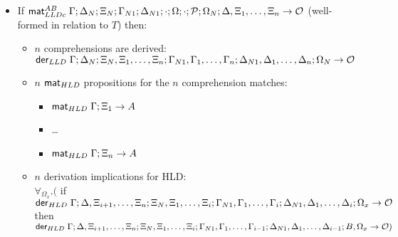 \begin{theorem}
\begin{itemize}[leftmargin=*]
   \item If $\mathsf{mat}_{LLDc}^{AB} \; \Gamma; \Delta_N; \Xi_N; \Gamma_{N1}; \Delta_{N1}; \cdot; \Omega;
      \cdot; \mathcal{P}; \Omega_N; \Delta, \Xi_1, \dotsc, \Xi_n \rightarrow \mathcal{O}$ (well-formed in relation to $T$) then:

   \begin{itemize}[leftmargin=\secondm]
      \item $n$ comprehensions are derived:\\
      $\mathsf{der}_{LLD} \; \Gamma; \Delta_N; \Xi_N, \Xi_1, \dotsc, \Xi_n; \Gamma_{N1},
      \Gamma_1, \dotsc, \Gamma_n; \Delta_{N1}, \Delta_1, \dotsc, \Delta_n; \Omega_N \rightarrow \mathcal{O}$

      \item $n$ $\mathsf{mat}_{HLD} \;$propositions for the $n$ comprehension matches:
      \begin{itemize}[leftmargin=\thirdm]
         \item $\mathsf{mat}_{HLD} \; \Gamma; \Xi_1 \rightarrow A$
         \item \dots
         \item $\mathsf{mat}_{HLD} \; \Gamma; \Xi_n \rightarrow A$
      \end{itemize}

      \item $n$ derivation implications for HLD: \\
      $\forall_{\Omega_x}.($ if $\mathsf{der}_{HLD} \; \Gamma; \Delta, \Xi_{i+1}, \dotsc, \Xi_{n}; \Xi_N, \Xi_1,
            \dotsc, \Xi_i; \Gamma_{N1}, \Gamma_1, \dotsc, \Gamma_i; \Delta_{N1},
            \Delta_1, \dotsc, \Delta_i; \Omega_x \rightarrow \mathcal{O}$ then $\mathsf{der}_{HLD} \; \Gamma; \Delta, \Xi_{i+1}, \dotsc, \Xi_{n}; \Xi_N, \Xi_1,
            \dotsc,
            \Xi_i; \Gamma_{N1}, \Gamma_1, \dotsc, \Gamma_{i-1}; \Delta_{N1},
            \Delta_1, \dotsc, \Delta_{i-1}; B, \Omega_x \rightarrow \mathcal{O})$
   \end{itemize}

\end{itemize}
   
\end{theorem}
